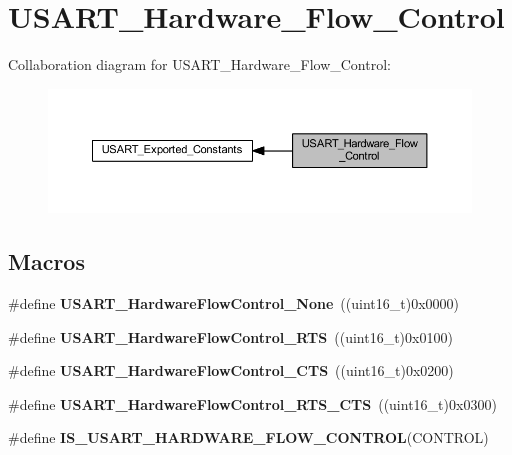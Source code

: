 \hypertarget{group___u_s_a_r_t___hardware___flow___control}{}\section{U\+S\+A\+R\+T\+\_\+\+Hardware\+\_\+\+Flow\+\_\+\+Control}
\label{group___u_s_a_r_t___hardware___flow___control}
Collaboration diagram for U\+S\+A\+R\+T\+\_\+\+Hardware\+\_\+\+Flow\+\_\+\+Control\+:\nopagebreak
\begin{figure}[H]
\begin{center}
\leavevmode
\includegraphics[width=350pt]{group___u_s_a_r_t___hardware___flow___control}
\end{center}
\end{figure}
\subsection*{Macros}
\begin{DoxyCompactItemize}
\item 
\mbox{\label{group___u_s_a_r_t___hardware___flow___control_gaf3deaf4429b88db7753ee203f4797bd3}} 
\#define {\bfseries U\+S\+A\+R\+T\+\_\+\+Hardware\+Flow\+Control\+\_\+\+None}~((uint16\+\_\+t)0x0000)
\item 
\mbox{\label{group___u_s_a_r_t___hardware___flow___control_ga22d4339693e3356d992abca259b0418e}} 
\#define {\bfseries U\+S\+A\+R\+T\+\_\+\+Hardware\+Flow\+Control\+\_\+\+R\+TS}~((uint16\+\_\+t)0x0100)
\item 
\mbox{\label{group___u_s_a_r_t___hardware___flow___control_ga4d989f112f94009c0849fe4dbe829d81}} 
\#define {\bfseries U\+S\+A\+R\+T\+\_\+\+Hardware\+Flow\+Control\+\_\+\+C\+TS}~((uint16\+\_\+t)0x0200)
\item 
\mbox{\label{group___u_s_a_r_t___hardware___flow___control_ga2986aed8c6cba414ac8afe0180ab553e}} 
\#define {\bfseries U\+S\+A\+R\+T\+\_\+\+Hardware\+Flow\+Control\+\_\+\+R\+T\+S\+\_\+\+C\+TS}~((uint16\+\_\+t)0x0300)
\item 
\#define {\bfseries I\+S\+\_\+\+U\+S\+A\+R\+T\+\_\+\+H\+A\+R\+D\+W\+A\+R\+E\+\_\+\+F\+L\+O\+W\+\_\+\+C\+O\+N\+T\+R\+OL}(C\+O\+N\+T\+R\+OL)
\end{DoxyCompactItemize}


